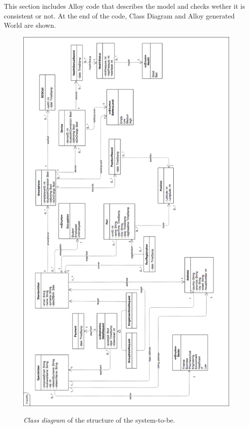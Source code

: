 This section includes Alloy code that describes the model and checks wether it is consistent or not.
At the end of the code, Class Diagram and Alloy generated World are shown.



\vfill

\begin{figure}[H]
  \begin{center}
  	\includegraphics[height=0.68\paperheight]{./img/Class_Diagram.png}
		\caption{\textit{Class diagram} of the structure of the system-to-be.}
    \hspace{0.05\linewidth}
    \centering
		\label{classDiagram}
    \end{center}
\end{figure}

